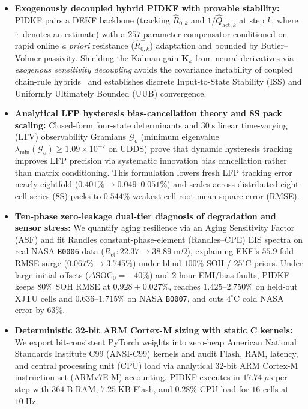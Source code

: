 \documentclass[10pt,a4paper]{article}
\providecommand{\upmu}{\mu}
\begin{document}
\begin{itemize}
\item \textbf{Exogenously decoupled hybrid PIDKF with provable stability:} PIDKF pairs a DEKF backbone (tracking $\hat{R}_{0,k}$ and $1/\hat{Q}_{\text{act},k}$ at step $k$, where $\hat{\cdot}$ denotes an estimate) with a $257$-parameter compensator conditioned on rapid online \emph{a priori} resistance ($\hat{R}_{0,k}^-$) adaptation and bounded by Butler--Volmer passivity. Shielding the Kalman gain $\mathbf{K}_k$ from neural derivatives via \emph{exogenous sensitivity decoupling} avoids the covariance instability of coupled chain-rule hybrids~\cite{Charkhgard2010dekf,Wang2024aekf_lstm,Yu2025lstm_ekf} and establishes discrete Input-to-State Stability (ISS) and Uniformly Ultimately Bounded (UUB) convergence.
\item \textbf{Analytical LFP hysteresis bias-cancellation theory and 8S pack scaling:} Closed-form four-state determinants and $30\;\mathrm{s}$ linear time-varying (LTV) observability Gramians $\mathcal{G}_o$ (minimum eigenvalue $\lambda_{\min}(\mathcal{G}_o) \ge 1.09\times 10^{-7}$ on UDDS) prove that dynamic hysteresis tracking improves LFP precision via systematic innovation bias cancellation rather than matrix conditioning. This formulation lowers fresh LFP tracking error nearly eightfold ($0.401\% \rightarrow 0.049\text{--}0.051\%$) and scales across distributed eight-cell series (8S) packs to $0.544\%$ weakest-cell root-mean-square error (RMSE).
\item \textbf{Ten-phase zero-leakage dual-tier diagnosis of degradation and sensor stress:} We quantify aging resilience via an Aging Sensitivity Factor (ASF) and fit Randles constant-phase-element (Randles--CPE) EIS spectra on real NASA \texttt{B0006} data ($R_{\text{ct}}: 22.37 \rightarrow 38.89\;\mathrm{m}\Omega$), explaining EKF's $55.9$-fold RMSE surge ($0.067\% \rightarrow 3.745\%$) under blind $100\%$ SOH / $25^\circ\text{C}$ priors. Under large initial offsets ($\Delta\text{SOC}_0 = -40\%$) and $2$-hour EMI/bias faults, PIDKF keeps $80\%$ SOH RMSE at $0.928\pm0.027\%$, reaches $1.425\text{--}2.750\%$ on held-out XJTU cells and $0.636\text{--}1.715\%$ on NASA \texttt{B0007}, and cuts $4^\circ\text{C}$ cold NASA error by $63\%$.
\item \textbf{Deterministic 32-bit ARM Cortex-M sizing with static C kernels:} We export bit-consistent PyTorch weights into zero-heap American National Standards Institute C99 (ANSI-C99) kernels and audit Flash, RAM, latency, and central processing unit (CPU) load via analytical 32-bit ARM Cortex-M instruction-set (ARMv7E-M) accounting. PIDKF executes in $17.74\;\upmu\mathrm{s}$ per step with $364\;\mathrm{B}$ RAM, $7.25\;\mathrm{KB}$ Flash, and $0.28\%$ CPU load for $16$ cells at $10\;\mathrm{Hz}$.
\end{itemize}
\end{document}

